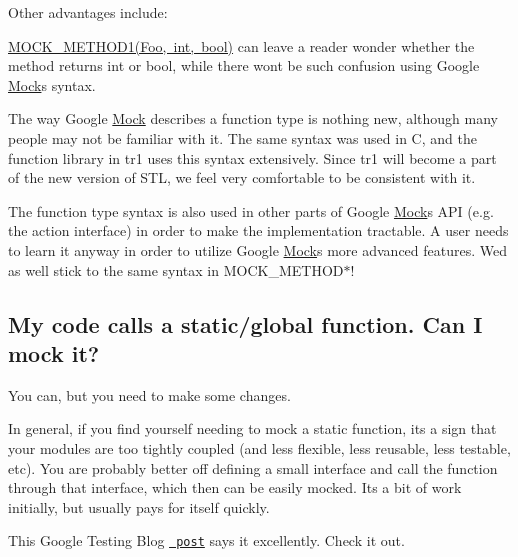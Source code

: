 Other advantages include\+:
\begin{DoxyEnumerate}
\item {\ttfamily \mbox{\hyperlink{gmock-generated-function-mockers_8h_ac49d366be035ee87b73264a29059cdc7}{M\+O\+C\+K\+\_\+\+M\+E\+T\+H\+O\+D1(\+Foo, int, bool)}}} can leave a reader wonder whether the method returns {\ttfamily int} or {\ttfamily bool}, while there won\textquotesingle{}t be such confusion using Google \mbox{\hyperlink{classMock}{Mock}}\textquotesingle{}s syntax.
\end{DoxyEnumerate}
\begin{DoxyEnumerate}
\item The way Google \mbox{\hyperlink{classMock}{Mock}} describes a function type is nothing new, although many people may not be familiar with it. The same syntax was used in C, and the {\ttfamily function} library in {\ttfamily tr1} uses this syntax extensively. Since {\ttfamily tr1} will become a part of the new version of S\+TL, we feel very comfortable to be consistent with it.
\end{DoxyEnumerate}
\begin{DoxyEnumerate}
\item The function type syntax is also used in other parts of Google \mbox{\hyperlink{classMock}{Mock}}\textquotesingle{}s A\+PI (e.\+g. the action interface) in order to make the implementation tractable. A user needs to learn it anyway in order to utilize Google \mbox{\hyperlink{classMock}{Mock}}\textquotesingle{}s more advanced features. We\textquotesingle{}d as well stick to the same syntax in {\ttfamily M\+O\+C\+K\+\_\+\+M\+E\+T\+H\+O\+D$\ast$}!
\end{DoxyEnumerate}

\subsection*{My code calls a static/global function. Can I mock it?}

You can, but you need to make some changes.

In general, if you find yourself needing to mock a static function, it\textquotesingle{}s a sign that your modules are too tightly coupled (and less flexible, less reusable, less testable, etc). You are probably better off defining a small interface and call the function through that interface, which then can be easily mocked. It\textquotesingle{}s a bit of work initially, but usually pays for itself quickly.

This Google Testing Blog \href{https://testing.googleblog.com/2008/06/defeat-static-cling.html}{\texttt{ post}} says it excellently. Check it out.

